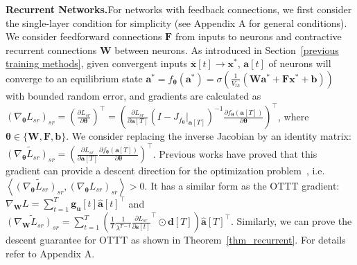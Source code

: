 \documentclass{article}
\begin{document}
\textbf{Recurrent Networks.}\quad For networks with feedback connections, we first consider the single-layer condition for simplicity (see Appendix A for general conditions). We consider feedforward connections $\mathbf{F}$ from inputs to neurons and contractive recurrent connections $\mathbf{W}$ between neurons. As introduced in Section~\ref{previous training methods}, given convergent inputs $\mathbf{\overline{x}}[t]\rightarrow \mathbf{x^*}$, $\mathbf{a}[t]$ of neurons will converge to an equilibrium state $\mathbf{a^*} = f_{\bm{\theta}}(\mathbf{a}^*) =  \sigma\left(\frac{1}{V_{th}}\left(\mathbf{W}\mathbf{a^*}+\mathbf{F}\mathbf{x^*}+\mathbf{b}\right)\right)$ with bounded random error, and gradients are calculated as $\left(\nabla_{\bm{\theta}}L_{sr}\right)_{sr}=\left(\frac{\partial L_{sr}}{\partial \bm{\theta}}\right)^\top = \left(\frac{\partial L_{sr}}{\partial \mathbf{a}[T]} \left(I-J_{f_{\bm{\theta}}}\vert_{\mathbf{a}[T]}\right)^{-1} \frac{\partial f_{\bm{\theta}}(\mathbf{a}[T])}{\partial \bm{\theta}}\right)^\top$, where $\bm{\theta} \in \{\mathbf{W}, \mathbf{F}, \mathbf{b}\}$. 
We consider replacing the inverse Jacobian by an identity matrix: $\widetilde{\left(\nabla_{\bm{\theta}}L_{sr}\right)_{sr}} = \left(\frac{\partial L_{sr}}{\partial \mathbf{a}[T]} \frac{\partial f_{\bm{\theta}}(\mathbf{a}[T])}{\partial \bm{\theta}}\right)^\top$. 
Previous works have proved that this gradient can provide a descent direction for the optimization problem~\cite{fung2021jfb,geng2021training}, i.e. $\left<\widetilde{\left(\nabla_{\bm{\theta}}L_{sr}\right)_{sr}}, \left(\nabla_{\bm{\theta}}L_{sr}\right)_{sr}\right> > 0$. It has a similar form as the OTTT gradient:  $\nabla_{\mathbf{W}}L=\sum_{t=1}^T\mathbf{g}_{\mathbf{u}}[t]{\hat{\mathbf{a}}[t]}^\top$ and $\widetilde{\left(\nabla_{\mathbf{W}}L_{sr}\right)_{sr}}=\sum_{t=1}^T\left(\frac{1}{T}\frac{1}{\lambda^{T-t}}\frac{\partial L_{sr}}{\partial \mathbf{s}[t]}^\top\odot \mathbf{d}[T]\right){\hat{\mathbf{a}}[T]}^\top$. 
Similarly, we can prove the descent guarantee for OTTT as shown in Theorem~\ref{thm_recurrent}. 
For details refer to Appendix A.
\end{document}
